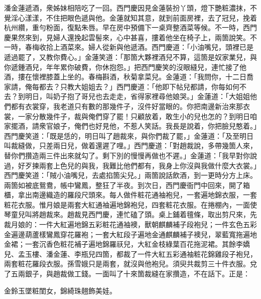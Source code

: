 潘金蓮遞酒，衆姊妹相陪吃了一回。西門慶因見金蓮裝扮丫頭，燈下艷粧濃抹，不覺淫心漾漾，不住把眼色遞與他。金蓮就知其意，就到前面房裡，去了冠兒，挽着杭州纘，重勻粉面，復點朱唇。早在房中預備下一桌齊整酒菜等候。不一時，西門慶果然來到，見婦人還挽起雲髻來，心中甚喜，摟着他坐在椅子上，兩箇說笑。不一時，春梅收拾上酒菜來。婦人從新與他遞酒。西門慶道：「小油嘴兒，頭裡已是遞過罷了，又教你費心。」金蓮笑道：「那箇大夥裡酒兒不算，這箇是奴家業兒，與你遞鍾酒兒，年年累你破費，你休抱怨。」把西門慶笑的沒眼縫兒，連忙接了他酒，摟在懷裡膝蓋上坐的。春梅斟酒，秋菊拿菜兒。金蓮道：「我問你，十二日喬家請，俺每都去？只教大姐姐去？」西門慶道：「他即下帖兒都請，你每如何不去？到明日，叫奶子抱了哥兒也去走走，省得家裡尋他娘哭。」金蓮道：「大姐姐他們都有衣裳穿，我老道只有數的那幾件子，沒件好當眼的。你把南邊新治來那衣裳，一家分散幾件子，裁與俺們穿了罷！只顧放着，敢生小的兒也怎的？到明日咱家擺酒，請衆官娘子，俺們也好見他，不惹人笑話。我長是說着，你把臉兒憨着。」西門慶笑道：「既是恁的，明日叫了趙裁來，與你們裁了罷，」金蓮道：「及至明日叫裁縫做，只差兩日兒，做着還遲了哩。」西門慶道：「對趙裁說，多帶幾箇人來，替你們攢造兩三件出來就勾了。剩下別的慢慢再做也不遲。」金蓮道：「我早對你說過，好歹揀兩套上色兒的與我，我難比他們都有，我身上你沒與我做什麼大衣裳。」西門慶笑道：「賊小油嘴兒，去處掐箇尖兒。」兩箇說話飲酒，到一更時分方上床。兩箇如被底鴛鴦，帳中鸞鳳，整狂了半夜。到次日，西門慶衙門中回來，開了箱櫃，拿出南邊織造的羅段尺頭來。每人做件粧花通袖袍兒，一套遍地錦衣服，一套粧花衣服。惟月娘是兩套大紅通袖遍地錦袍兒，四套粧花衣服。在捲棚內，一面使琴童兒叫將趙裁來。趙裁見西門慶，連忙磕了頭。桌上鋪着氊條，取出剪尺來，先裁月娘的：一件大紅遍地錦五彩粧花通袖襖，獸朝麒麟補子段袍兒；一件玄色五彩金遍邊葫蘆樣鸞鳳穿花羅袍；一套大紅段子遍地金通麒麟補子襖兒，翠藍寬拖遍地金裙；一套沉香色粧花補子遍地錦羅祆兒，大紅金枝綠葉百花拖泥裙。其餘李嬌兒、孟玉樓、潘金蓮、李瓶兒四箇，都裁了一件大紅五彩通袖粧花錦雞段子袍兒，兩套粧花羅段衣服。孫雪娥只是兩套，就沒與他袍兒。須臾共裁剪三十件衣服。兌了五兩銀子，與趙裁做工錢。一面叫了十來箇裁縫在家攢造，不在話下。正是：

\begin{myquote}
金鈴玉墜粧閨女，錦綺珠翹飾美娃。
\end{myquote}

